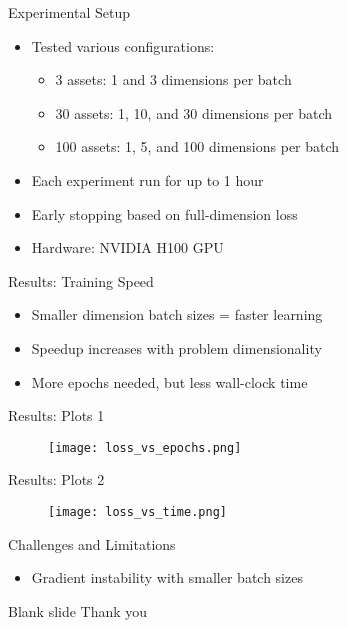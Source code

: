 \documentclass{beamer}
\begin{document}
\begin{frame}{Experimental Setup}
\begin{itemize}
    \item Tested various configurations:
    \begin{itemize}
        \item 3 assets: 1 and 3 dimensions per batch
        \item 30 assets: 1, 10, and 30 dimensions per batch
        \item 100 assets: 1, 5, and 100 dimensions per batch
    \end{itemize}
    \item Each experiment run for up to 1 hour
    \item Early stopping based on full-dimension loss
    \item Hardware: NVIDIA H100 GPU
\end{itemize}
\end{frame}

\begin{frame}{Results: Training Speed}
\begin{itemize}
    \item Smaller dimension batch sizes = faster learning
    \item Speedup increases with problem dimensionality
    \item More epochs needed, but less wall-clock time
\end{itemize}
\end{frame}

\begin{frame}{Results: Plots 1}
\begin{figure}
    \centering
    \texttt{[image: loss\_vs\_epochs.png]}
    \label{fig:enter-label}
\end{figure}
\end{frame}

\begin{frame}{Results: Plots 2}
\begin{figure}
    \centering
    \texttt{[image: loss\_vs\_time.png]}
    \label{fig:enter-label}
\end{figure}
\end{frame}

\begin{frame}{Challenges and Limitations}
\begin{itemize}
    \item Gradient instability with smaller batch sizes
\end{itemize}
\end{frame}

\begin{frame}{Blank slide}
Thank you

\end{frame}
\end{document}
